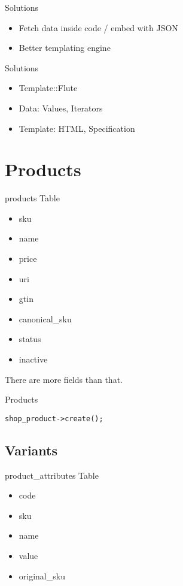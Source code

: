 \begin{frame}{Solutions}
\begin{itemize}
\item Fetch data inside code / embed with JSON
\item Better templating engine
\end{itemize}
\end{frame}

\begin{frame}{Solutions}
\begin{itemize}
\item Template::Flute
\item Data: Values, Iterators
\item Template: HTML, Specification
\end{itemize}
\end{frame}

\section{Products}
\begin{frame}[fragile]{products Table}
\begin{itemize}
\item sku
\item name
\item price
\item uri
\item gtin
\item canonical\_sku
\item status
\item inactive
\end{itemize}
\end{frame}

There are more fields than that.

\begin{frame}[fragile]{Products}
\begin{lstlisting}
shop_product->create();
\end{lstlisting}
\end{frame}

\subsection{Variants}
\begin{frame}[fragile]{product\_attributes Table}
\begin{itemize}
\item code
\item sku
\item name
\item value
\item original\_sku
\end{itemize}
\end{frame}

